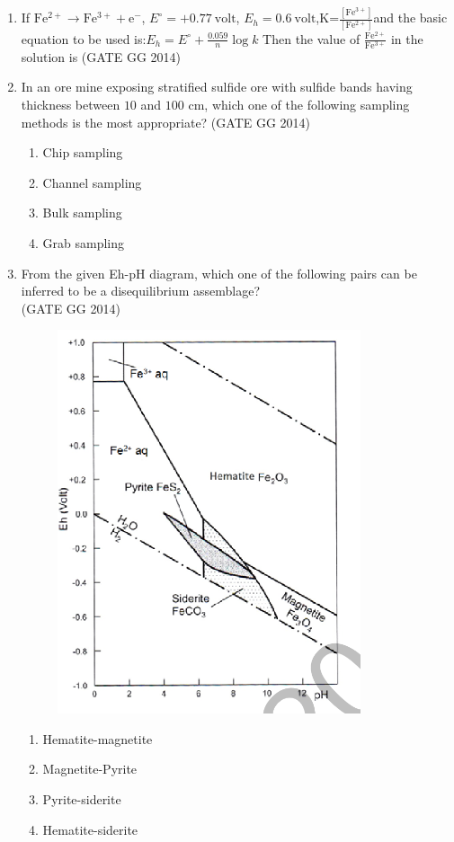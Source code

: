 \documentclass[journal]{IEEEtran}
\begin{document}
\begin{enumerate}[start=1]
\vspace{0.5cm}

\item If $\mathrm{Fe^{2+} \rightarrow Fe^{3+} + e^-}$, $E^\circ = +0.77 \ \mathrm{volt}$, $E_h = 0.6 \ \mathrm{volt}$,K=$\frac{[\mathrm{Fe^{3+}}]}{[\mathrm{Fe^{2+}}]}$and the basic equation to be used is:$E_h=E^\circ +\frac{0.059}{n}\log k$ Then the value of $\frac{\mathrm{Fe^{2+}}}{\mathrm{Fe^{3+}}}$  in the solution is \underline{\hspace{1.5cm}} 
\hfill(GATE GG 2014)
\vspace{0.5cm}

\item  In an ore mine exposing stratified sulfide ore with sulfide bands having thickness between $10$ and $100$ cm, which one of the following sampling methods is the most appropriate?
\hfill(GATE GG 2014)

\begin{enumerate}

    \item Chip sampling
    \item Channel sampling
    \item Bulk sampling
    \item Grab sampling
\end{enumerate}

\item From the given Eh-pH diagram, which one of the following pairs can be inferred to be a disequilibrium assemblage?\\
\hspace*{15.7cm}(GATE GG 2014)
\begin{figure}[H]
    \centering
    \includegraphics[width=0.26\columnwidth]{figs/04.png} 
    \caption{}
    \label{fig:48}
\end{figure}
\begin{multicols}{2}
\begin{enumerate}
    \item Hematite-magnetite
    \item Magnetite-Pyrite
    \item Pyrite-siderite
    \item Hematite-siderite
\end{enumerate}
\end{multicols}


\end{enumerate}
\end{document}

